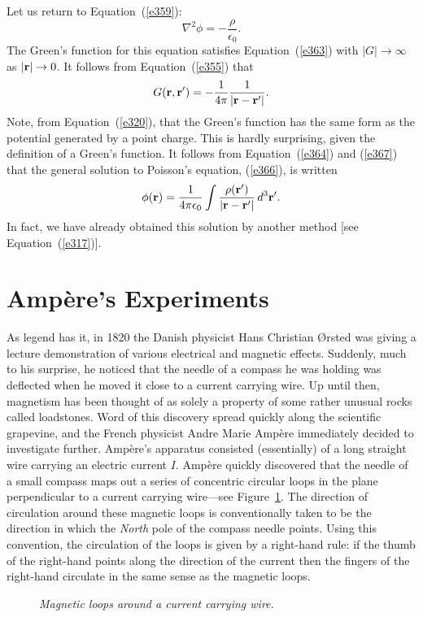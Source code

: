 Let us return to Equation~(\ref{e359}):
\begin{equation}\label{e366}
\nabla^2 \phi = -\frac{\rho}{\epsilon_0}.
\end{equation}
The Green's function for this equation satisfies Equation~(\ref{e363}) with $|G|\rightarrow \infty$
as $|{\bf r}|\rightarrow 0$. It follows from Equation~(\ref{e355}) that
\begin{equation}\label{e367}
G({\bf r}, {\bf r}') = -\frac{1}{4\pi} \frac{1}{|{\bf r} - {\bf r}'|}.
\end{equation}
Note, from Equation~(\ref{e320}), that the Green's function has the same form as the potential
generated by a point charge. This is hardly surprising, given the definition of
a Green's function. It follows from Equation~(\ref{e364}) and (\ref{e367}) that the general solution
to Poisson's equation, (\ref{e366}), is written
\begin{equation}
\phi({\bf r}) = \frac{1}{4\pi\epsilon_0}\int \frac{\rho({\bf r}')}
{|{\bf r} - {\bf r}'|} \,d^3{\bf r}'.
\end{equation}
In fact, we have already obtained this solution by another method [see Equation~(\ref{e317})].

\section{Amp\`{e}re's Experiments}
As legend has it, in 1820 the Danish physicist Hans Christian \O rsted was giving a lecture 
demonstration of various electrical and
magnetic effects. Suddenly, much to his surprise, he noticed that
the needle of a compass he was holding
was deflected  when he moved it close to  a current carrying
wire. Up until then, magnetism has been thought of as solely a property of some rather
unusual rocks called loadstones.
Word of this discovery spread quickly along the scientific grapevine,
and the French physicist  Andre Marie Amp\`{e}re 
immediately decided to investigate further. 
Amp\`{e}re's apparatus consisted (essentially) of a long straight wire carrying an
electric 
current $I$. Amp\`{e}re quickly discovered that the needle of a small compass maps
out a series of concentric circular loops in the plane
perpendicular to  a current carrying wire---see Figure~\ref{f27}.
The direction of circulation around these magnetic loops is conventionally taken to be
the direction in which the {\em North}\/ pole of the compass needle
points.
Using  this convention, the circulation of the loops is given by a
right-hand rule: if the thumb of the right-hand points along the direction of the
current then the fingers of the right-hand circulate in the same sense as the 
magnetic loops.
\begin{figure}
\epsfysize=2.5in
\centerline{}
\caption{\em Magnetic loops around a current carrying wire.}\label{f27}
\end{figure}

